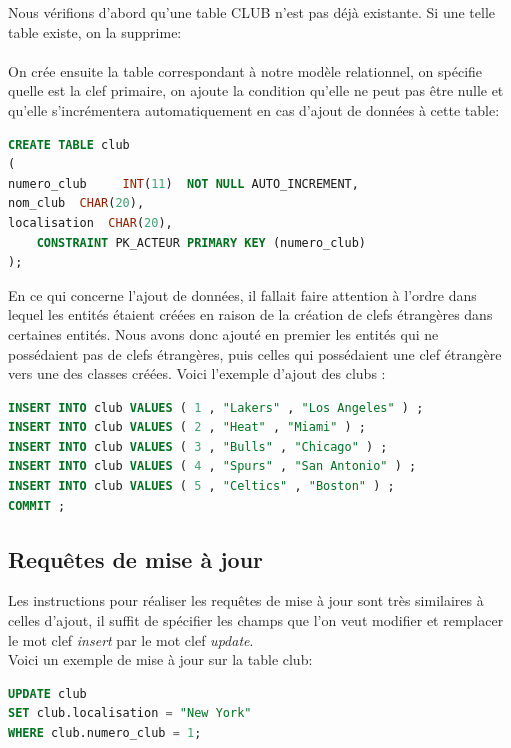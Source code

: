 \documentclass[a4paper,12pt]{article}
\begin{document}
Nous vérifions d'abord qu'une table \textsf{CLUB} n'est pas déjà existante. Si une telle table existe, on la supprime:\\
\\

On crée ensuite la table correspondant à notre modèle relationnel, on spécifie quelle est la clef primaire, on ajoute la condition qu'elle ne peut pas être nulle et qu'elle s'incrémentera automatiquement en cas d'ajout de données à cette table:\\

\begin{lstlisting}[language=SQL, caption=Initialisation Club, frame=shadowbox]
CREATE TABLE club
(
numero_club     INT(11)  NOT NULL AUTO_INCREMENT,
nom_club  CHAR(20),
localisation  CHAR(20),
    CONSTRAINT PK_ACTEUR PRIMARY KEY (numero_club)
);
\end{lstlisting}
\vspace{0.5cm}

En ce qui concerne l'ajout de données, il fallait faire attention à l'ordre dans lequel les entités étaient créées en raison de la création de clefs étrangères dans certaines entités. Nous avons donc ajouté en premier les entités qui ne possédaient pas de clefs étrangères, puis celles qui possédaient une clef étrangère vers une des classes créées. Voici l'exemple d'ajout des clubs :\\

\begin{lstlisting}[language=SQL, caption= Ajout des equipes, frame=shadowbox]
INSERT INTO club VALUES ( 1 , "Lakers" , "Los Angeles" ) ;
INSERT INTO club VALUES ( 2 , "Heat" , "Miami" ) ;
INSERT INTO club VALUES ( 3 , "Bulls" , "Chicago" ) ;
INSERT INTO club VALUES ( 4 , "Spurs" , "San Antonio" ) ;
INSERT INTO club VALUES ( 5 , "Celtics" , "Boston" ) ;
COMMIT ;
\end{lstlisting}

\subsection{Requêtes de mise à jour}
Les instructions pour réaliser les requêtes de mise à jour sont très similaires à celles d'ajout, il suffit de spécifier les champs que l'on veut modifier et remplacer le mot clef \textit{insert} par le mot clef \textit{update}.\\

Voici un exemple de mise à jour sur la table club:
\begin{lstlisting}[language=SQL, caption=Modification de la localisation d'un club, frame=shadowbox]
UPDATE club
SET club.localisation = "New York"
WHERE club.numero_club = 1;
\end{lstlisting}
\end{document}
